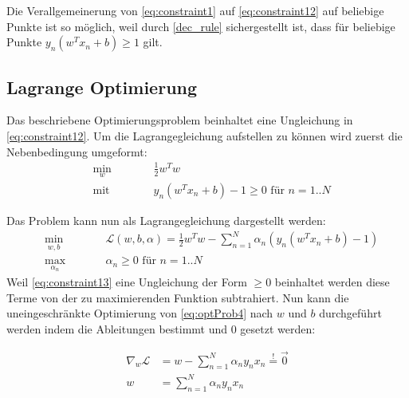 \documentclass[a4paper,11pt,twoside]{scrreprt}
\newcommand{\Lagr}{\mathcal{L}}
\begin{document}
Die Verallgemeinerung von \autoref{eq:constraint1} auf \autoref{eq:constraint12} auf beliebige Punkte ist so möglich, weil durch \autoref{dec_rule} sichergestellt ist, dass für beliebige Punkte $y_{n}(w^{T} x_{n} + b) \geq 1$ gilt.

\subsection{Lagrange Optimierung} \label{sec:lagrange}

Das beschriebene Optimierungsproblem beinhaltet eine Ungleichung in \autoref{eq:constraint12}. Um die Lagrangegleichung aufstellen zu können wird zuerst die Nebenbedingung umgeformt:
\begin{subequations} \label{min_problem}
	\begin{alignat}{2}
		&\!\min_{w}        &\qquad&  \frac{1}{2} w^{T} w \label{eq:optProb3}\\
		&\text{mit } &      & y_n (w^{T} x_{n} + b)-1 \geq 0 \text{ für } n=1..N \label{eq:constraint13}
	\end{alignat}
\end{subequations}

Das Problem kann nun als Lagrangegleichung dargestellt werden:
\begin{subequations}
	\begin{alignat}{2}
		&\!\min_{w, b}        &\qquad&  \Lagr (w, b, \alpha) = \frac{1}{2} w^{T} w - \sum_{n=1}^{N} \alpha_{n} (y_n (w^{T} x_{n} + b)-1) \label{eq:optProb4}\\
		&\max_{\alpha_{n}} &      & \alpha_{n} \geq 0 \text{ für } n=1..N \label{eq:constraint14}
	\end{alignat}
\end{subequations}
 Weil \autoref{eq:constraint13} eine Ungleichung der Form $\geq 0$ beinhaltet werden diese Terme von der zu maximierenden Funktion subtrahiert. Nun kann die uneingeschränkte Optimierung von \autoref{eq:optProb4} nach $w$ und $b$ durchgeführt werden indem die Ableitungen bestimmt und $0$ gesetzt werden:

\begin{equation} \label{gradient_lagrange_w}
	\begin{aligned}
		\nabla_{w} \Lagr &= w - \sum_{n=1}^{N} \alpha_{n} y_{n} x_{n} \overset{!}{=} \vec{0} \\
		w &= \sum_{n=1}^{N} \alpha_{n} y_{n} x_{n}
	\end{aligned}
\end{equation}
\end{document}
